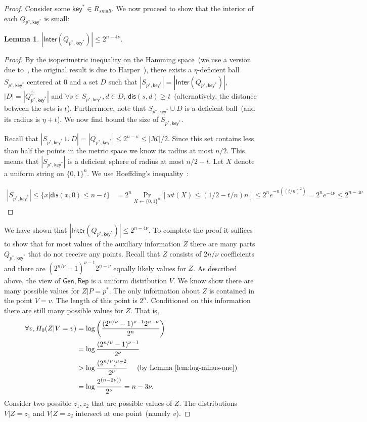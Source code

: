 \documentclass[11pt]{article}
\newcommand{\lemref}[1]{\mbox{Lemma~\ref{#1}}}
\newcommand{\class}[1]{{\ensuremath{\mathsf{#1}}}}
\newcommand{\key}{\ensuremath{\class{key}}\xspace}
\newcommand{\gen}{\ensuremath{\class{Gen}}\xspace}
\newcommand{\rep}{\ensuremath{\class{Rep}}\xspace}
\newcommand{\inter}{\ensuremath{\class{Inter}}\xspace}
\newcommand{\zo}{\ensuremath{\{0, 1\}}}
\newcommand{\dis}{\ensuremath{\mathsf{dis}}}
\newtheorem{lemma}[theorem]{Lemma}
\begin{document}
\begin{proof}
Consider some $\key^*\in R_{small}$.  
We now proceed to show that the interior of each $Q_{p^*, \key^*}$ is small:

\begin{lemma}
$|\inter(Q_{p^*, \key^*})| \le 2^{n-4\nu}$.
\end{lemma}
\begin{proof}
By the isoperimetric inequality on the Hamming space~(we use a version due to~\cite[Theorem 1]{frankl1981short}, the original result is due to Harper~\cite{harper1966optimal}), there exists a $\eta$-deficient ball $S_{p^*, \key^*}$ centered at $0$ and a set $D$ such that $|S_{p^*, \key^*}| = |\inter(Q_{p^*, \key^*})|$, $|D| = |Q_{p^*, \key^*}^\complement|$ and $\forall s\in S_{p^*, \key^*}, d\in D$, $\dis(s, d) \ge t$~(alternatively, the distance between the sets is $t$).  Furthermore, note that $S_{p^*, \key^*} \cup D$ is a deficient ball~(and its radius is $\eta+t$).
We now find bound the size of $S_{p^*, \key^*}$.

Recall that $|S_{p^*, \key^*} \cup D| = |Q_{p^*, \key^*} | \le 2^{n-\kappa}\leq |\mathcal{M}|/2$.  Since this set contains less than half the points in the metric space we know its radius at most $n/2$.  This means that $|S_{p^*, \key^*}|$ is a deficient sphere of radius at most $n/2-t$.  Let $X$ denote a uniform string on $\zo^n$.  We use Hoeffding's inequality~\cite{hoeffding1963probability}:

\begin{align*}
|S_{p^*, \key^*}| \le \{ x | \dis (x, 0)\le n-t\} &= 2^n \Pr_{X\leftarrow \zo^n} [ wt(X) \le (1/2-t/n)n] \le 2^n e^{-n ((t/n)^2)} = 2^n e^{-4\nu} \le 2^{n - 4\nu}
\end{align*}
\end{proof}

We have shown that $|\inter(Q_{p^*, \key^*})| \le 2^{n-4\nu}$.  
To complete the proof it suffices to show that for most values of the auxiliary information $Z$ there are many parts $Q_{p^*, \key^*}$ that do not receive any points.  
Recall that $Z$ consists of $2n/\nu$ coefficients and there are $(2^{n/\nu}-1)^{\nu-1} 2^{n-\nu}$ equally likely values for $Z$.
 As described above, the view of $\gen, \rep$ is a uniform distribution $V$.  We know show there are many possible values for $Z |P=p^*$.  The only information about $Z$ is contained in the point  $V=v$.  The length of this point is $2^n$.  Conditioned on this information there are still many possible values for $Z$.  That is, 
 \begin{align*}
 \forall v, H_0(Z | V=v) &=\log \left(\frac{(2^{n/\nu}-1)^{\nu-1} 2^{n-\nu}}{2^n} \right)\\
  &= \log \frac{(2^{n/\nu}-1)^{\nu-1}}{2^{\nu}} \\
  &>\log  \frac{(2^{n/\nu})^{\nu-2}}{2^{\nu}} \ \ \ \ \mbox{(by \lemref{lem:log-minus-one})}\\
  &=\log \frac{2^{(n-2\nu))}}{2^\nu} = n -3\nu.
 \end{align*}
Consider two possible $z_1, z_2$ that are possible values of $Z$.  The distributions $V| Z=z_1$ and $V | Z=z_2$ intersect at one point~(namely $v$).  


\end{proof}
\end{document}
